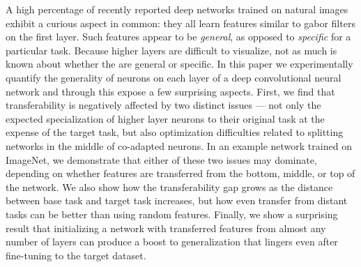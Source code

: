 
A high percentage of recently reported deep networks trained on
natural images exhibit a curious aspect in common: they all learn
features similar to gabor filters on the first layer. Such features
appear to be \emph{general}, as opposed to \emph{specific} for a
particular task. Because higher layers are difficult to visualize, not
as much is known about whether the are general or specific. In this
paper we experimentally quantify the generality of neurons on each
layer of a deep convolutional neural network and through this expose a
few surprising aspects. First, we find that transferability is
negatively affected by two distinct issues --- not only the expected
specialization of higher layer neurons to their original task at the
expense of the target task, but also optimization difficulties related
to splitting networks in the middle of co-adapted neurons. In an
example network trained on ImageNet, we demonstrate that either of
these two issues may dominate, depending on whether features are
transferred from the bottom, middle, or top of the network.  We also
show how the transferability gap grows as the distance between base
task and target task increases, but how even transfer from distant
tasks can be better than using random features. Finally, we show a
surprising result that initializing a network with transferred
features from almost any number of layers can produce a boost to
generalization that lingers even after fine-tuning to the target
dataset.
